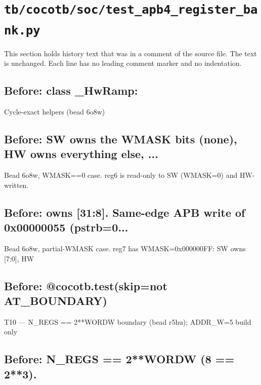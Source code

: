 \section{\texttt{tb/cocotb/soc/test\_apb4\_register\_bank.py}}\label{cr:suite:soc-test-apb4-register-bank}

This section holds history text that was in a comment of the source file. The text is unchanged. Each line has no leading comment marker and no indentation.

\begin{record}

\subsection*{Before: class \_HwRamp:}

\begin{textblock}
Cycle-exact helpers (bead 6o8w)
\end{textblock}

\subsection*{Before: SW owns the WMASK bits (none), HW owns everything else, ...}

\begin{textblock}
Bead 6o8w, WMASK==0 case.  reg6 is read-only to SW (WMASK=0) and HW-written.
\end{textblock}

\subsection*{Before: owns [31:8].  Same-edge APB write of 0x00000055 (pstrb=0...}

\begin{textblock}
Bead 6o8w, partial-WMASK case.  reg7 has WMASK=0x000000FF: SW owns [7:0], HW
\end{textblock}

\subsection*{Before: @cocotb.test(skip=not AT\_BOUNDARY)}

\begin{textblock}
T10 — N_REGS == 2**WORDW boundary (bead r5hu); ADDR_W=5 build only
\end{textblock}

\subsection*{Before: N\_REGS == 2**WORDW (8 == 2**3).}


\end{record}
